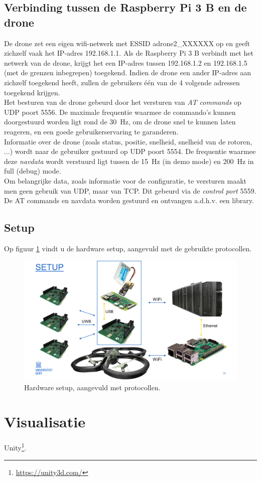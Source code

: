 \subsection{Verbinding tussen de Raspberry Pi 3 B en de drone} \label{sec:raspberry_drone}
De drone zet een eigen wifi-netwerk met ESSID adrone2\_XXXXXX  op en geeft zichzelf vaak het IP-adres 192.168.1.1.
Als de Raspberry Pi 3 B verbindt met het netwerk van de drone, krijgt het een IP-adres tussen 192.168.1.2 en 192.168.1.5 (met de grenzen inbegrepen) toegekend.
Indien de drone een ander IP-adres aan zichzelf toegekend heeft, zullen de gebruikers één van de 4 volgende adressen toegekend krijgen.\\
Het besturen van de drone gebeurd door het versturen van \textit{AT commands} op UDP poort 5556.
De maximale frequentie waarmee de commando's kunnen doorgestuurd worden ligt rond de \SI{30}{\Hz}, om de drone snel te kunnen laten reageren, en een goede gebruikerservaring te garanderen.\\ 

Informatie over de drone (zoals status, positie, snelheid, snelheid van de rotoren, ...) wordt naar de gebruiker gestuurd op UDP poort 5554.
De frequentie waarmee deze \textit{navdata} wordt verstuurd ligt tussen de \SI{15}{\Hz} (in demo mode) en \SI{200}{\Hz} in full (debug) mode.\\
Om belangrijke data, zoals informatie voor de configuratie, te versturen maakt men geen gebruik van UDP, maar van TCP.
Dit gebeurd via de \textit{control port} 5559. \cite{developer_guide2012}\\
De AT commands en navdata worden gestuurd en ontvangen a.d.h.v. een library.

\subsection{Setup} \label{sec:setup}
Op figuur \ref{fig:setup} vindt u de hardware setup, aangevuld met de gebruikte protocollen.
\begin{figure}[p]
	\centering
	\includegraphics[width=\textwidth]{Setup}
	\caption[Setup]{Hardware setup, aangevuld met protocollen.}
	\label{fig:setup}
\end{figure}

\section{Visualisatie} \label{sec:visualization}
Unity\footnote{\url{https://unity3d.com/}}.